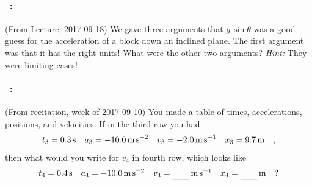 \documentclass[12pt]{article}
\begin{document}
\vfill

\paragraph{\problemname~\theproblem:}%
(From Lecture, 2017-09-18)
We gave three arguments that $g\,\sin\theta$ was a good guess for the
acceleration of a block down an inclined plane. The first argument was that it
has the right units! What were the other two arguments? \emph{Hint:} They were limiting
cases!

\vfill

\paragraph{\problemname~\theproblem:}%
(From recitation, week of 2017-09-10)
You made a table of times, accelerations, positions, and velocities.
If in the third row you had
\begin{equation}
t_3 = 0.3\,\mathrm{s}
\quad
a_3 = -10.0\,\mathrm{m}\,\mathrm{s}^{-2}
\quad
v_3 = -2.0\,\mathrm{m}\,\mathrm{s}^{-1}
\quad
x_3 = 9.7\,\mathrm{m}
\quad ,
\end{equation}
then what would you write for $v_4$ in fourth row, which looks like
\begin{equation}
t_4 = 0.4\,\s
\quad
a_4 = -10.0\,\mpss
\quad
v_4 = \rule[-1ex]{20pt}{0.1pt}\,\mps
\quad
x_4 = \rule[-1ex]{20pt}{0.1pt}\,\m
\quad ?
\end{equation}

\vfill
~
\end{document}
